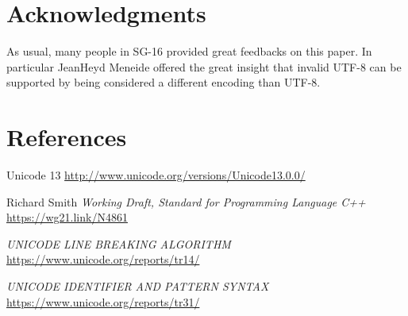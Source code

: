 \documentclass{wg21}
\begin{document}
\section{Acknowledgments}

As usual, many people in SG-16 provided great feedbacks on this paper.
In particular JeanHeyd Meneide offered the great insight that invalid UTF-8 can be supported by being considered a different encoding than UTF-8.


\section{References}
\renewcommand{\section}[2]{}%



\begin{thebibliography}{9}


    Unicode 13\newline
    \url{http://www.unicode.org/versions/Unicode13.0.0/}


    Richard Smith
    \emph{Working Draft, Standard for Programming Language C++}\newline
    \url{https://wg21.link/N4861}


    \emph{UNICODE LINE BREAKING ALGORITHM}\newline
    \url{https://www.unicode.org/reports/tr14/}

    \emph{UNICODE IDENTIFIER AND PATTERN SYNTAX}\newline
    \url{https://www.unicode.org/reports/tr31/}

\end{thebibliography}
\end{document}
